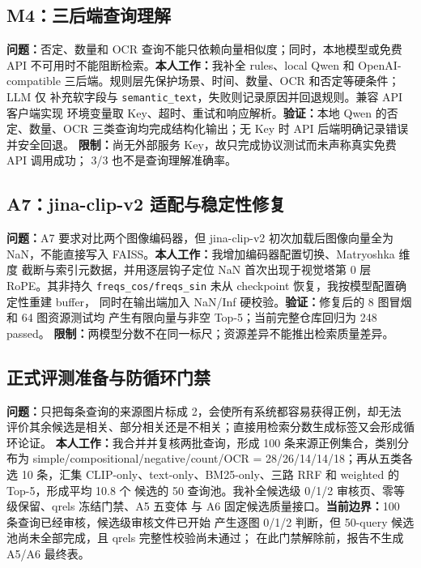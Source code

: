 \documentclass[UTF8,11pt,a4paper]{ctexart}
\begin{document}
\subsection{M4：三后端查询理解}

\textbf{问题：}否定、数量和 OCR 查询不能只依赖向量相似度；同时，本地模型或免费 API
不可用时不能阻断检索。\textbf{本人工作：}我补全 rules、local Qwen 和
OpenAI-compatible 三后端。规则层先保护场景、时间、数量、OCR 和否定等硬条件；LLM 仅
补充软字段与 \texttt{semantic\_text}，失败则记录原因并回退规则。兼容 API 客户端实现
环境变量取 Key、超时、重试和响应解析。\textbf{验证：}本地 Qwen 的否定、数量、OCR
三类查询均完成结构化输出；无 Key 时 API 后端明确记录错误并安全回退。
\textbf{限制：}尚无外部服务 Key，故只完成协议测试而未声称真实免费 API 调用成功；
3/3 也不是查询理解准确率。

\subsection{A7：jina-clip-v2 适配与稳定性修复}

\textbf{问题：}A7 要求对比两个图像编码器，但 jina-clip-v2 初次加载后图像向量全为
NaN，不能直接写入 FAISS。\textbf{本人工作：}我增加编码器配置切换、Matryoshka 维度
截断与索引元数据，并用逐层钩子定位 NaN 首次出现于视觉塔第 0 层 RoPE。其非持久
\texttt{freqs\_cos/freqs\_sin} 未从 checkpoint 恢复，我按模型配置确定性重建 buffer，
同时在输出端加入 NaN/Inf 硬校验。\textbf{验证：}修复后的 8 图冒烟和 64 图资源测试均
产生有限向量与非空 Top-5；当前完整仓库回归为 248 passed。
\textbf{限制：}两模型分数不在同一标尺；资源差异不能推出检索质量差异。

\subsection{正式评测准备与防循环门禁}

\textbf{问题：}只把每条查询的来源图片标成 2，会使所有系统都容易获得正例，却无法
评价其余候选是相关、部分相关还是不相关；直接用检索分数生成标签又会形成循环论证。
\textbf{本人工作：}我合并并复核两批查询，形成 100 条来源正例集合，类别分布为
simple/compositional/negative/count/OCR = 28/26/14/14/18；再从五类各选 10 条，汇集
CLIP-only、text-only、BM25-only、三路 RRF 和 weighted 的 Top-5，形成平均 10.8 个
候选的 50 查询池。我补全候选级 0/1/2 审核页、零等级保留、qrels 冻结门禁、A5 五变体
与 A6 固定候选质量接口。\textbf{当前边界：}100 条查询已经审核，候选级审核文件已开始
产生逐图 0/1/2 判断，但 50-query 候选池尚未全部完成，且 qrels 完整性校验尚未通过；
在此门禁解除前，报告不生成 A5/A6 最终表。
\end{document}
